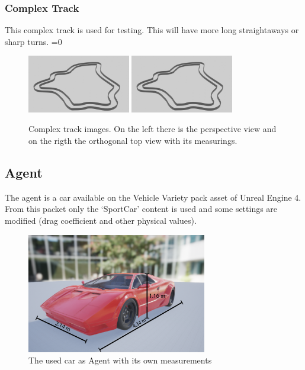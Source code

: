 \documentclass[14pt]{extarticle}
\def\sp{\vspace{5pt}}
\newcounter{debug}
\begin{document}
\begin{flushleft}
	\subsubsection{Complex Track}
	This complex track is used for testing. This will have more long straightaways or sharp turns.
	\ifnum\value{debug}=0 {
	\begin{figure}[H]
    		\centering\includegraphics[width=0.4\textwidth]{./Image/Environment/Med/perspective.png}
    		    		\centering\includegraphics[width=0.4\textwidth]{./Image/Environment/Med/perspective.png}
		\vspace{5mm}
		\caption{Complex track images. On the left there is the perspective view and on the rigth the orthogonal top view with its measurings.}
	\end{figure}
	}\fi
	
	\subsection{Agent}
	\sp
	The agent is a car available on the Vehicle Variety pack \cite{VVp} asset of Unreal Engine 4. From this packet only the `SportCar' content is used and some settings are modified (drag coefficient and other physical values).
	\begin{figure}[H]
    		\centering\includegraphics[width=0.7\textwidth]{./Image/Agent/car.png}
		\vspace{5mm}
    		\caption{The used car as Agent with its own measurements}
	\end{figure}
	

\end{flushleft}
\end{document}
